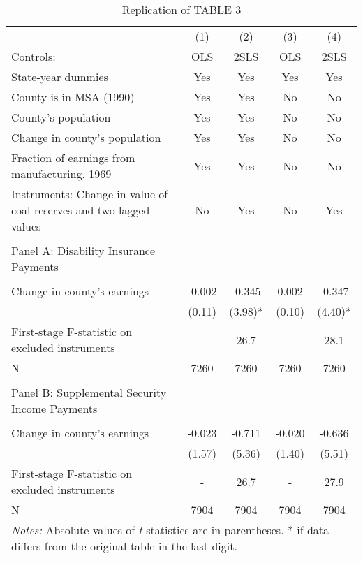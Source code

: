 \documentclass{article} %
\begin{document}
\begin{table}
	\centering
	\caption{Replication of TABLE 3}
	\begin{tabular}{l c c c c}
		\hline\hline
		& (1) & (2) & (3) & (4) \\
		Controls: & OLS &  2SLS & OLS & 2SLS \\
		\hline	 					
		State-year dummies & Yes & Yes & Yes & Yes \\	
		County is in MSA (1990) & Yes & Yes & No & No \\	 		
		County's population & Yes & Yes & No & No \\	 		
		Change in county's population & Yes & Yes & No & No \\	
		Fraction of earnings from manufacturing, 1969 & Yes & Yes & No & No \\	
		Instruments: Change in value of coal reserves and two lagged values & No & Yes & No & Yes \\
		&&&&\\
		Panel A: Disability Insurance Payments &  &  &  & \\
		&&&&\\
		Change in county's earnings & -0.002 & -0.345 & 0.002 & -0.347 \\
		& (0.11) & (3.98)* & (0.10) & (4.40)* \\	
		First-stage F-statistic on excluded instruments & - & 26.7 & - & 28.1 \\
		N & 7260 & 7260 & 7260 & 7260 \\		
		&&&&\\
		Panel B: Supplemental Security Income Payments &  &  &  & \\
		&&&&\\
		Change in county's earnings & -0.023 & -0.711 & -0.020 & -0.636 \\
		& (1.57) & (5.36) & (1.40) & (5.51) \\
		First-stage F-statistic on excluded instruments & - & 26.7 & - & 27.9 \\
		N & 7904 & 7904 & 7904 & 7904 \\				
		\hline\hline 
		\multicolumn{5}{l}{{\footnotesize \textit{Notes:} Absolute values of \textit{t}-statistics are in parentheses. * if data differs from the original table in the last digit.}}
	\end{tabular}
\end{table} 
\end{document}
